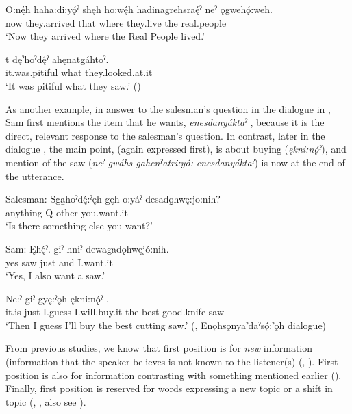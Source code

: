 \ea\label{ex:flexwordex6}
\ea\label{ex:flexwordex6a}
\gll  O:nę́h haha:di:yǫ́ˀ shęh ho:wę́h hadinagrehsraę́ˀ neˀ ǫgwehǫ́:weh.\\
now they.arrived that where they.live the real.people\\
\glt ‘Now they arrived where the Real People lived.’

\ex\label{ex:flexwordex6b}
\gll {}t dęˀhoˀdę́ˀ ahęnatgáhtoˀ.\\
it.was.pitiful what they.looked.at.it\\
\glt  ‘It was pitiful what they saw.’ (\cite{carrier_legends_2013})
\z
\z

As another example, in answer to the salesman’s question in the dialogue in , Sam first mentions the item that he wants, \textit{enesdanyáktaˀ} , because it is the direct, relevant response to the salesman’s question. In contrast, later in the dialogue , the main point, (again expressed first), is about buying (\textit{ękni:nǫ́ˀ}), and mention of the saw (\textit{neˀ gwáhs ga̱henˀatri:yó: enesdanyáktaˀ}) is now at the end of the utterance. 

\ea\label{ex:flexwordex5}
\ea\label{ex:flexwordex5a}
\gll Salesman: Sga̱hoˀdę́:ˀęh gęh o:yáˀ desadǫ̱hwę:jo:nih? \\
{} anything Q other you.want.it\\
\glt ‘Is there something else you want?’

\ex\label{ex:flexwordex5b}
\gll Sam: Ęhę́ˀ.  giˀ hniˀ dewagadǫhwęjó:nih. \\
{} yes saw just and I.want.it\\
\glt ‘Yes, I also want a saw.’

\ex\label{ex:flexwordex5c}
\gll Ne:ˀ giˀ gyę:ˀǫh ękni:nǫ́ˀ    . \\
{} it.is just I.guess I.will.buy.it the best good.knife saw\\
\glt ‘Then I guess I’ll buy the best cutting saw.’ (\cite[159]{mithun_watewayestanih_1984}, Enǫhsǫnyaˀdaˀsǫ́:ˀǫh dialogue)
\z
\z

From previous studies, we know that first position is for \emph{new} information (information that the speaker believes is not known to the listener(s) (\cite[29--30]{mithun_is_1992}, \cite[408]{mithun_morphological_1995}). First position is also for information contrasting with something mentioned earlier (\cite[37]{mithun_is_1992}). Finally, first position is reserved for words expressing a new topic or a shift in topic (\cite[27, 29--32]{mithun_is_1992}, \cite[405]{mithun_morphological_1995}, also see \cite{chafe_discourse_1994}).

